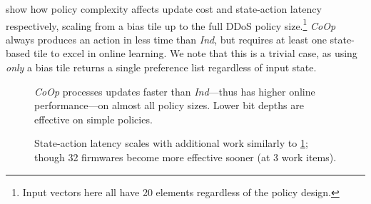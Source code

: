 \documentclass[
sigconf,natbib=false
,anonymous=true
,10pt
]{acmart}
\newcommand{\Coopfw}{\emph{CoOp}}
\newcommand{\Indfw}{\emph{Ind}}
\begin{document}
 show how policy complexity affects update cost and state-action latency respectively, scaling from a bias tile up to the full DDoS policy size.\footnote{Input vectors here all have 20 elements regardless of the policy design.}
\Coopfw{} always produces an action in less time than \Indfw{}, but requires at least one state-based tile to excel in online learning.
We note that this is a trivial case, as using \emph{only} a bias tile returns a single preference list regardless of input state.

\begin{figure}[t]
	\caption{\Coopfw{} processes updates faster than \Indfw{}---thus has higher online performance---on almost all policy sizes. Lower bit depths are effective on simple policies.\label{fig:vary-work}}
\end{figure}

\begin{figure}
	\caption{State-action latency scales with additional work similarly to \cref{fig:vary-work}; though \SI{32}{\bit} firmwares become more effective sooner (at \num{3} work items).\label{fig:vary-work-latency}}
\end{figure}
\end{document}
